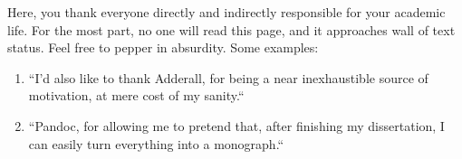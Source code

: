 Here, you thank everyone directly and indirectly responsible for your academic life. For the most part, no one will read this page, and it approaches wall of text status. Feel free to pepper in absurdity. Some examples:

\begin{enumerate}
\item ``I'd also like to thank Adderall, for being a near inexhaustible source of motivation, at mere cost of my sanity.``
\item ``Pandoc, for allowing me to pretend that, after finishing my dissertation, I can easily turn everything into a monograph.``
\end{enumerate}

